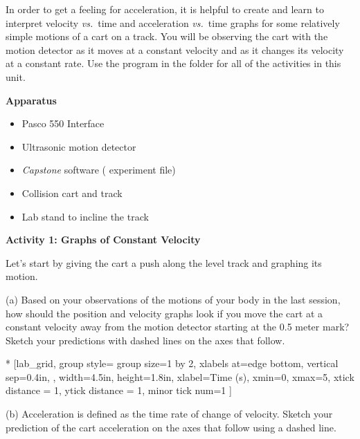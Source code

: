 In order to get a feeling for acceleration, it is helpful to create and learn
to interpret velocity \textit{vs.}~time and acceleration \textit{vs.}~time graphs for some relatively
simple motions of a cart on a track. You will be observing the cart with the
motion detector as it moves at a constant velocity and as it changes its velocity
at a constant rate. Use the 
 program in the \filename{\coursefolder} folder
for all of the activities in this unit.

\bigskip
\textbf{Apparatus} 
\vspace{-\parskip}
\begin{itemize}
\item Pasco 550 Interface
\item Ultrasonic motion detector 
\item \textit{Capstone} software ( experiment file)
\item Collision cart and track 
\item Lab stand to incline the track 
\end{itemize}

\textbf{Activity 1: Graphs of Constant Velocity} 

Let's start by giving the cart a push along the level track and graphing its
motion. 

(a) Based on your observations of the motions of your body in the last session,
how should the position and velocity graphs look if you move the cart at a constant
velocity away from the motion detector starting at the 0.5 meter mark? Sketch
your predictions with dashed lines on the axes that follow.


\begin{lab_groupplot}*{}
					[lab_grid,
	group style={
		group size=1 by 2,
		xlabels at=edge bottom,
		vertical sep=0.4in,
		},
	width=4.5in, height=1.8in,
	xlabel=Time (s),
	xmin=0, xmax=5,
	xtick distance = 1, 
	ytick distance = 1, 
	minor tick num=1
	]
\nextgroupplot[
	ymin=0,ymax=2, 
	ylabel={Position (m)},
	ylabel_align={-1},
	]
\nextgroupplot[
	ymin=-1,ymax=1, 
	ylabel={Velocity (m/s)},
	]
\end{lab_groupplot}

(b) Acceleration is defined as the time rate of change of velocity. Sketch your
prediction of the cart acceleration on the axes that follow using a dashed line.

